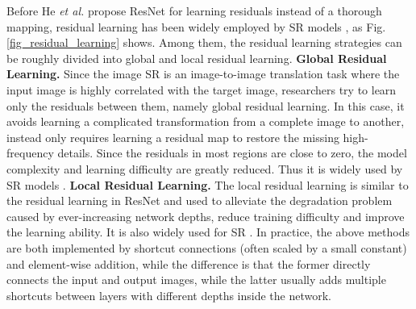 {\label{sec_residual_learning}
Before He \textit{et al.}  propose ResNet for learning residuals instead of a thorough mapping, residual learning has been widely employed by SR models , as Fig. \ref{fig_residual_learning} shows.
Among them, the residual learning strategies can be roughly divided into global and local residual learning.
\textbf{Global Residual Learning.}
Since the image SR is an image-to-image translation task where the input image is highly correlated with the target image, researchers try to learn only the residuals between them, namely global residual learning.
In this case, it avoids learning a complicated transformation from a complete image to another, instead only requires learning a residual map to restore the missing high-frequency details.
Since the residuals in most regions are close to zero, the model complexity and learning difficulty are greatly reduced.
Thus it is widely used by SR models .
\textbf{Local Residual Learning.}
The local residual learning is similar to the residual learning in ResNet  and used to alleviate the degradation problem  caused by ever-increasing network depths, reduce training difficulty and improve the learning ability.
It is also widely used for SR .
In practice, the above methods are both implemented by shortcut connections (often scaled by a small constant) and element-wise addition, while the difference is that the former directly connects the input and output images, while the latter usually adds multiple shortcuts between layers with different depths inside the network.

}
